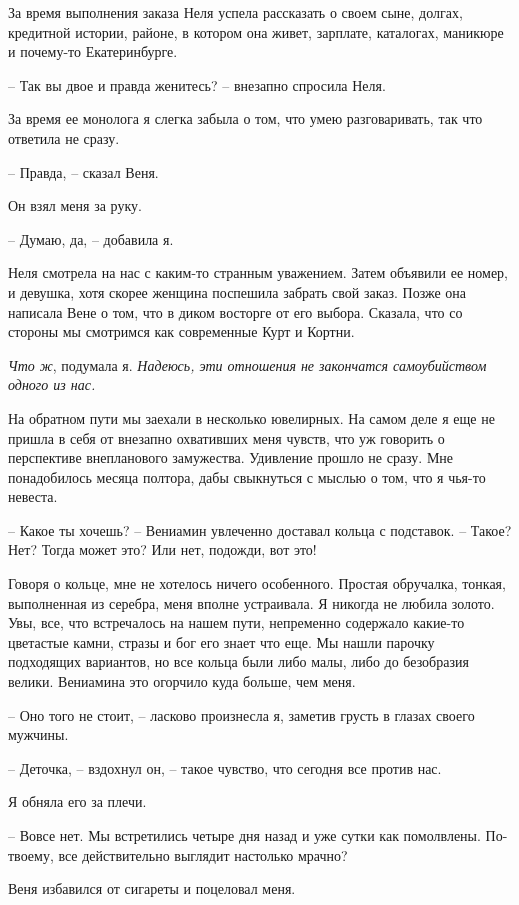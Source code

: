 \documentclass[
]{book}
\begin{document}
За время выполнения заказа Неля успела рассказать о своем сыне, долгах, кредитной истории, районе, в котором она живет, зарплате, каталогах, маникюре и почему-то Екатеринбурге.

-- Так вы двое и правда женитесь? -- внезапно спросила Неля.

За время ее монолога я слегка забыла о том, что умею разговаривать, так что ответила не сразу.

-- Правда, -- сказал Веня.

Он взял меня за руку.

-- Думаю, да, -- добавила я.

Неля смотрела на нас с каким-то странным уважением. Затем объявили ее номер, и девушка, хотя скорее женщина поспешила забрать свой заказ. Позже она написала Вене о том, что в диком восторге от его выбора. Сказала, что со стороны мы смотримся как современные Курт и Кортни.

\emph{Что ж}, подумала я. \emph{Надеюсь, эти отношения не закончатся самоубийством одного из нас.}

На обратном пути мы заехали в несколько ювелирных. На самом деле я еще не пришла в себя от внезапно охвативших меня чувств, что уж говорить о перспективе внепланового замужества. Удивление прошло не сразу. Мне понадобилось месяца полтора, дабы свыкнуться с мыслью о том, что я чья-то невеста.

-- Какое ты хочешь? -- Вениамин увлеченно доставал кольца с подставок. -- Такое? Нет? Тогда может это? Или нет, подожди, вот это!

Говоря о кольце, мне не хотелось ничего особенного. Простая обручалка, тонкая, выполненная из серебра, меня вполне устраивала. Я никогда не любила золото. Увы, все, что встречалось на нашем пути, непременно содержало какие-то цветастые камни, стразы и бог его знает что еще. Мы нашли парочку подходящих вариантов, но все кольца были либо малы, либо до безобразия велики. Вениамина это огорчило куда больше, чем меня.

-- Оно того не стоит, -- ласково произнесла я, заметив грусть в глазах своего мужчины.

-- Деточка, -- вздохнул он, -- такое чувство, что сегодня все против нас.

Я обняла его за плечи.

-- Вовсе нет. Мы встретились четыре дня назад и уже сутки как помолвлены. По-твоему, все действительно выглядит настолько мрачно?

Веня избавился от сигареты и поцеловал меня.
\end{document}
